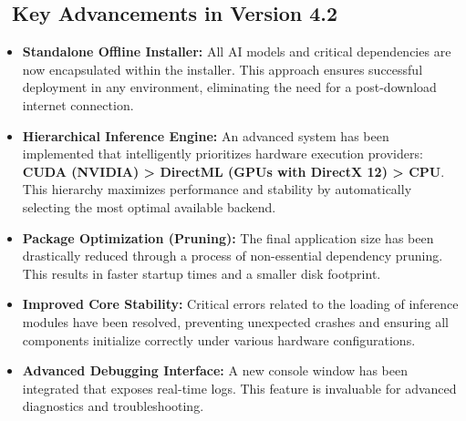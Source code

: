 \documentclass[11pt, a4paper]{article}
\newcommand{\SectionColor}{WarlockGray} %
\newcommand{\setsectioncolor}[1]{\renewcommand{\SectionColor}{#1}}
\begin{document}
\subsection{\faBoxOpen\ Key Advancements in Version 4.2}
\begin{itemize}[leftmargin=*, itemsep=2pt]
    \item \textbf{Standalone Offline Installer:} All AI models and critical dependencies are now encapsulated within the installer. This approach ensures successful deployment in any environment, eliminating the need for a post-download internet connection.
    \item \textbf{Hierarchical Inference Engine:} An advanced system has been implemented that intelligently prioritizes hardware execution providers: \textbf{CUDA (NVIDIA) > DirectML (GPUs with DirectX 12) > CPU}. This hierarchy maximizes performance and stability by automatically selecting the most optimal available backend.
    \item \textbf{Package Optimization (Pruning):} The final application size has been drastically reduced through a process of non-essential dependency pruning. This results in faster startup times and a smaller disk footprint.
    \item \textbf{Improved Core Stability:} Critical errors related to the loading of inference modules have been resolved, preventing unexpected crashes and ensuring all components initialize correctly under various hardware configurations.
    \item \textbf{Advanced Debugging Interface:} A new console window has been integrated that exposes real-time logs. This feature is invaluable for advanced diagnostics and troubleshooting.
\end{itemize}

\setsectioncolor{QuickStartColor}
\end{document}

